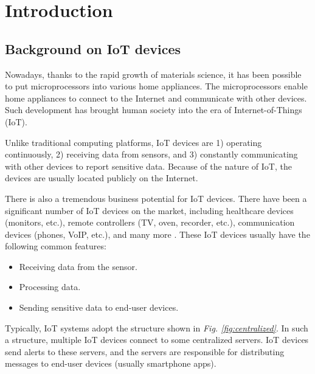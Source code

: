 \chapter{Introduction}

\section{Background on IoT devices}

Nowadays, thanks to the rapid growth of materials science, it has been possible to put microprocessors into various home appliances. The microprocessors enable home appliances to connect to the Internet and communicate with other devices. Such development has brought human society into the era of Internet-of-Things (IoT). 

Unlike traditional computing platforms, IoT devices are 1) operating continuously, 2) receiving data from sensors, and 3) constantly communicating with other devices to report sensitive data. Because of the nature of IoT, the devices are usually located publicly on the Internet. 

There is also a tremendous business potential for IoT devices. There have been a significant number of IoT devices on the market, including healthcare devices (monitors, etc.), remote controllers (TV, oven, recorder, etc.), communication devices (phones, VoIP, etc.), and many more \cite{hoang2015tor}. These IoT devices usually have the following common features:

\begin{itemize}
	\item Receiving data from the sensor.
	\item Processing data.
	\item Sending sensitive data to end-user devices. 
\end{itemize}

Typically, IoT systems adopt the structure shown in \textit{Fig. \ref{fig:centralized}}. In such a structure, multiple IoT devices connect to some centralized servers. IoT devices send alerts to these servers, and the servers are responsible for distributing messages to end-user devices (usually smartphone apps).

